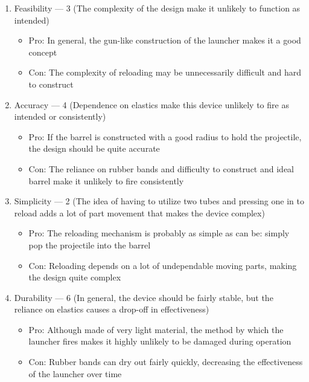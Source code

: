 \begin{enumerate}

  \item Feasibility — 3 (The complexity of the design make it unlikely to function as intended)

    \begin{itemize}

      \item Pro: In general, the gun-like construction of the launcher makes it a good concept

      \item Con: The complexity of reloading may be unnecessarily difficult and hard to construct

    \end{itemize}

  \item Accuracy — 4 (Dependence on elastics make this device unlikely to fire as intended or consistently)

    \begin{itemize}

      \item Pro: If the barrel is constructed with a good radius to hold the projectile, the design should be quite accurate

      \item Con: The reliance on rubber bands and difficulty to construct and ideal barrel make it unlikely to fire consistently

    \end{itemize}

  \item Simplicity — 2 (The idea of having to utilize two tubes and pressing one in to reload adds a lot of part movement that makes the device complex)

    \begin{itemize}

      \item Pro: The reloading mechanism is probably as simple as can be: simply pop the projectile into the barrel

      \item Con: Reloading depends on a lot of undependable moving parts, making the design quite complex

    \end{itemize}

  \item Durability — 6 (In general, the device should be fairly stable, but the reliance on elastics causes a drop-off in effectiveness)

    \begin{itemize}

      \item Pro: Although made of very light material, the method by which the launcher fires makes it highly unlikely to be damaged during operation

      \item Con: Rubber bands can dry out fairly quickly, decreasing the effectiveness of the launcher over time

    \end{itemize}

\end{enumerate}

